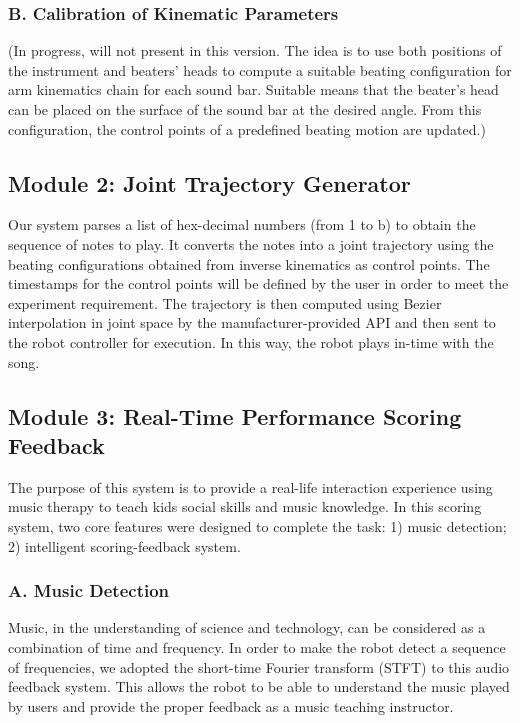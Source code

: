 \subsubsection{B. Calibration of Kinematic Parameters}
(In progress, will not present in this version. The idea is to use both positions 
of the instrument and beaters' heads to compute a suitable 
beating configuration for arm kinematics chain for each sound bar. Suitable means that the beater's 
head can be placed on the surface of the sound bar at the desired angle. From 
this configuration, the control points of a predefined beating motion are updated.)\\ 

\subsection{Module 2: Joint Trajectory Generator}
Our system parses a list of hex-decimal numbers (from 1 to b) to obtain the sequence
of notes to play. It converts the notes into a joint trajectory using the beating
configurations obtained from inverse kinematics as control points. The timestamps
for the control points will be defined by the user in order to meet the experiment requirement.
The trajectory is then computed using Bezier interpolation in joint space by the
manufacturer-provided API and then sent to the robot controller for execution. In this
way, the robot plays in-time with the song.\\

\subsection{Module 3: Real-Time Performance Scoring Feedback}
The purpose of this system is to provide a real-life interaction experience using 
music therapy to teach kids social skills and music knowledge.  In this scoring 
system, two core features were designed to complete the task: 1) music detection;
2) intelligent scoring-feedback system.\\


\subsubsection{A. Music Detection}
Music, in the understanding of science and technology, can be considered as a combination 
of time and frequency. In order to make the robot detect a sequence of frequencies, we adopted the 
short-time Fourier transform (STFT) to this audio feedback system. This allows the robot to 
be able to understand the music played by users and provide the proper feedback as
a music teaching instructor.\\

